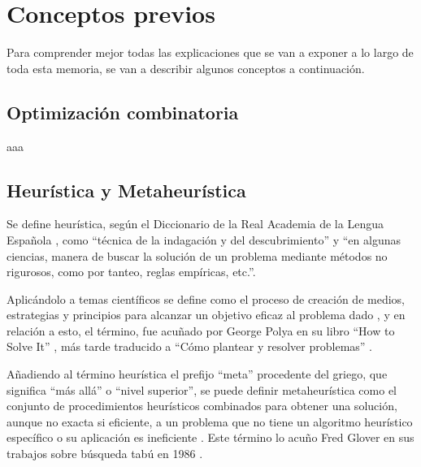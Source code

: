 \section{Conceptos previos}
Para comprender mejor todas las explicaciones que se van a exponer a lo largo de toda esta memoria, se van a describir algunos conceptos a continuación.

\subsection{Optimización combinatoria}
aaa

\subsection{Heurística y Metaheurística}
Se define heurística, según el Diccionario de la Real Academia de la Lengua Española \cite{rae-heuristica}, como ``técnica de la indagación y del descubrimiento'' y ``en algunas ciencias, manera de buscar la solución de un problema mediante métodos no rigurosos, como por tanteo, reglas empíricas, etc.''.

Aplicándolo a temas científicos se define como el proceso de creación de medios, estrategias y principios para alcanzar un objetivo eficaz al problema dado \cite{conceptodef-heuristica}, y en relación a esto, el término, fue acuñado por George Polya en su libro ``How to Solve It'' \cite{gpolya-book-1}, más tarde traducido a ``Cómo plantear y resolver problemas'' \cite{gpolya-book-2}.

Añadiendo al término heurística el prefijo ``meta'' procedente del griego, que significa ``más allá'' o ``nivel superior'', se puede definir metaheurística como el conjunto de procedimientos heurísticos combinados para obtener una solución, aunque no exacta si eficiente, a un problema que no tiene un algoritmo heurístico específico o su aplicación es ineficiente \cite{wiki-metaheuristica}. Este término lo acuño Fred Glover en sus trabajos sobre búsqueda tabú en 1986 \cite{fred-glover}.

